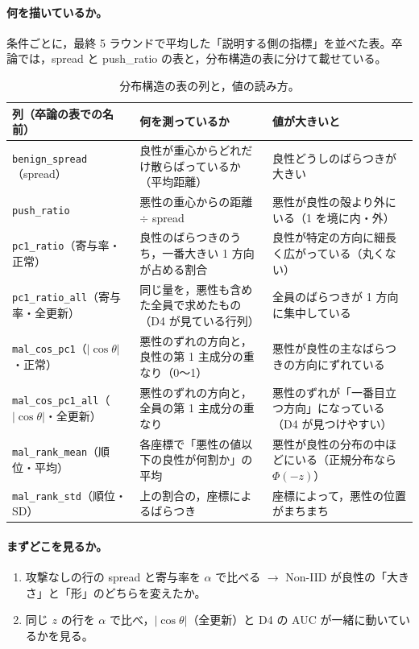 \documentclass[a4j, dvipdfmx]{jsarticle}  %
\begin{document}
\paragraph{何を描いているか。}
条件ごとに，最終 5 ラウンドで平均した「説明する側の指標」を並べた表。卒論では，spread と push\_ratio の表と，分布構造の表に分けて載せている。
\begin{table}[H]
\centering
\caption{分布構造の表の列と，値の読み方。}
\small
\begin{tabular}{@{}P{3.4cm} P{5.9cm} P{6.0cm}@{}}
\toprule
列（卒論の表での名前） & 何を測っているか & 値が大きいと \\
\midrule
\texttt{benign\_spread}（spread） & 良性が重心からどれだけ散らばっているか（平均距離） & 良性どうしのばらつきが大きい \\
\texttt{push\_ratio} & 悪性の重心からの距離 $\div$ spread & 悪性が良性の殻より外にいる（1 を境に内・外） \\
\texttt{pc1\_ratio}（寄与率・正常） & 良性のばらつきのうち，一番大きい 1 方向が占める割合 & 良性が特定の方向に細長く広がっている（丸くない） \\
\texttt{pc1\_ratio\_all}（寄与率・全更新） & 同じ量を，悪性も含めた全員で求めたもの（D4 が見ている行列） & 全員のばらつきが 1 方向に集中している \\
\texttt{mal\_cos\_pc1}（$|\cos\theta|$・正常） & 悪性のずれの方向と，良性の第 1 主成分の重なり（0〜1） & 悪性が良性の主なばらつきの方向にずれている \\
\texttt{mal\_cos\_pc1\_all}（$|\cos\theta|$・全更新） & 悪性のずれの方向と，全員の第 1 主成分の重なり & 悪性のずれが「一番目立つ方向」になっている（D4 が見つけやすい） \\
\texttt{mal\_rank\_mean}（順位・平均） & 各座標で「悪性の値以下の良性が何割か」の平均 & 悪性が良性の分布の中ほどにいる（正規分布なら $\Phi(-z)$） \\
\texttt{mal\_rank\_std}（順位・SD） & 上の割合の，座標によるばらつき & 座標によって，悪性の位置がまちまち \\
\bottomrule
\end{tabular}
\end{table}

\paragraph{まずどこを見るか。}
\begin{enumerate}
  \item 攻撃なしの行の spread と寄与率を $\alpha$ で比べる $\rightarrow$ Non-IID が良性の「大きさ」と「形」のどちらを変えたか。
  \item 同じ $z$ の行を $\alpha$ で比べ，$|\cos\theta|$（全更新）と D4 の AUC が一緒に動いているかを見る。
\end{enumerate}
\end{document}
